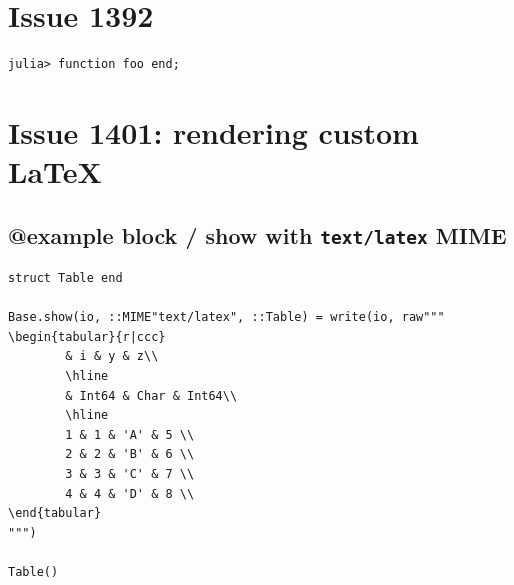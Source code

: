 \section{Issue 1392}



\label{126240678836585045}{}



\begin{verbatim}
julia> function foo end;
\end{verbatim}



\section{Issue 1401: rendering custom LaTeX}



\label{16729107124711032682}{}


\subsection{@example block / show with \texttt{text/latex} MIME}



\label{3426876613775016555}{}



\begin{verbatim}
struct Table end

Base.show(io, ::MIME"text/latex", ::Table) = write(io, raw"""
\begin{tabular}{r|ccc}
        & i & y & z\\
        \hline
        & Int64 & Char & Int64\\
        \hline
        1 & 1 & 'A' & 5 \\
        2 & 2 & 'B' & 6 \\
        3 & 3 & 'C' & 7 \\
        4 & 4 & 'D' & 8 \\
\end{tabular}
""")

Table()
\end{verbatim}

\begin{table}[h]
\centering
{}\end{table}


